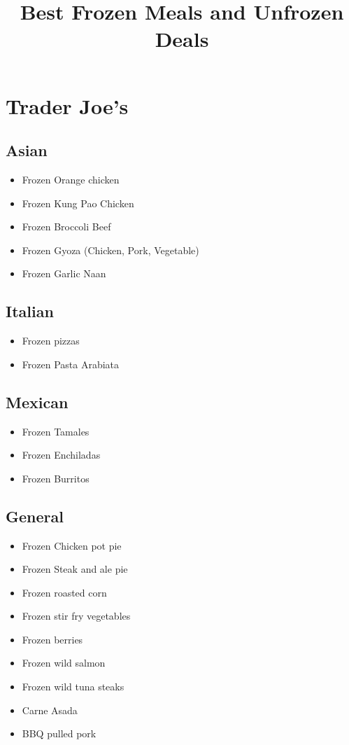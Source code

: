 \documentclass{article}
\title{Best Frozen Meals and Unfrozen Deals}
\begin{document}
\section{Trader Joe's}

\subsection{Asian}
\begin{itemize}
\item{Frozen Orange chicken}
\item{Frozen Kung Pao Chicken}
\item{Frozen Broccoli Beef}
\item{Frozen Gyoza (Chicken, Pork, Vegetable)}
\item{Frozen Garlic Naan}
\end{itemize}
\subsection{Italian}
\begin{itemize}
\item{Frozen pizzas}
\item{Frozen Pasta Arabiata}
\end{itemize}
\subsection{Mexican}
\begin{itemize}
\item{Frozen Tamales}
\item{Frozen Enchiladas}
\item{Frozen Burritos}
\end{itemize}
\subsection{General}
\begin{itemize}
\item{Frozen Chicken pot pie}
\item{Frozen Steak and ale pie}
\item{Frozen roasted corn}
\item{Frozen stir fry vegetables}
\item{Frozen berries}
\item{Frozen wild salmon}
\item{Frozen wild tuna steaks}
\item{Carne Asada}
\item{BBQ pulled pork}
\end{itemize}
\end{document}
